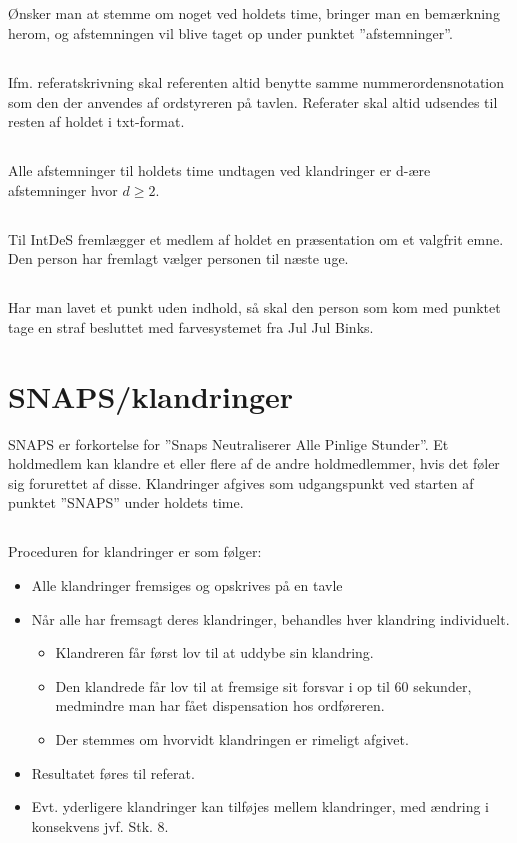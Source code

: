 \documentclass{article}
\newcommand{\JJB}{Jul Jul Binks}
\begin{document}
	\subsection{}
	Ønsker man at stemme om noget ved holdets time, bringer man en bemærkning herom, og afstemningen vil blive taget op under punktet ”afstemninger”.
	\subsection{}
	Ifm. referatskrivning skal referenten altid benytte samme nummerordensnotation som den der anvendes af ordstyreren på tavlen. Referater skal altid udsendes til resten af holdet i txt-format.
	\subsection{}
	Alle afstemninger til holdets time undtagen ved klandringer er d-ære afstemninger hvor $d \geq 2$.
	\subsection{}
	Til IntDeS fremlægger et medlem af holdet en præsentation om et valgfrit emne. Den person har fremlagt vælger personen til næste uge.
	\subsection{}
	Har man lavet et punkt uden indhold, så skal den person som kom med punktet tage en straf besluttet med farvesystemet fra \JJB.

	\section{SNAPS/klandringer}
	SNAPS er forkortelse for ”Snaps Neutraliserer Alle Pinlige Stunder”. Et holdmedlem kan klandre et eller flere af de andre holdmedlemmer, hvis det føler sig forurettet af disse. Klandringer afgives som udgangspunkt ved starten af punktet ”SNAPS” under holdets time.
	\subsection{}
	Proceduren for klandringer er som følger:
	\begin{itemize}
		\item Alle klandringer fremsiges og opskrives på en tavle
		\item Når alle har fremsagt deres klandringer, behandles hver klandring individuelt.
		\begin{itemize}
			\item Klandreren får først lov til at uddybe sin klandring.
			\item Den klandrede får lov til at fremsige sit forsvar i op til 60 sekunder, medmindre man har fået dispensation hos ordføreren.
			\item Der stemmes om hvorvidt klandringen er rimeligt afgivet.
		\end{itemize}
		\item Resultatet føres til referat.
		\item Evt. yderligere klandringer kan tilføjes mellem klandringer, med ændring i konsekvens jvf. Stk. 8.
	\end{itemize}
\end{document}

